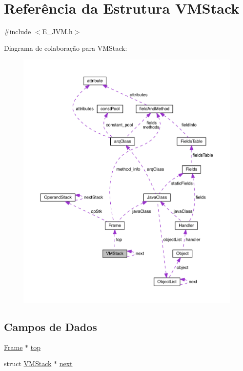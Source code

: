\hypertarget{struct_v_m_stack}{}\section{Referência da Estrutura V\+M\+Stack}
\label{struct_v_m_stack}


{\ttfamily \#include $<$E\+\_\+\+J\+V\+M.\+h$>$}



Diagrama de colaboração para V\+M\+Stack\+:
\nopagebreak
\begin{figure}[H]
\begin{center}
\leavevmode
\includegraphics[width=350pt]{struct_v_m_stack__coll__graph}
\end{center}
\end{figure}
\subsection*{Campos de Dados}
\begin{DoxyCompactItemize}
\item 
\hyperlink{struct_frame}{Frame} $\ast$ \hyperlink{struct_v_m_stack_a4ced44fa90e0389a8b25963637c1708d}{top}
\item 
struct \hyperlink{struct_v_m_stack}{V\+M\+Stack} $\ast$ \hyperlink{struct_v_m_stack_ab4cf67571dfab96182dfd57bf6037d6b}{next}
\end{DoxyCompactItemize}


